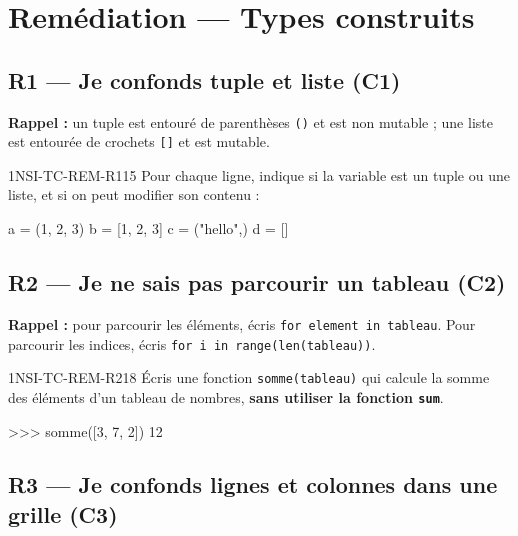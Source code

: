 \section*{Remédiation --- Types construits}

\subsection*{R1 --- Je confonds tuple et liste (C1)}

\textbf{Rappel :} un tuple est entouré de parenthèses \lstinline{()} et est non mutable ;
une liste est entourée de crochets \lstinline{[]} et est mutable.

\begin{exercice}{1NSI-TC-REM-R1}{1}{5}
Pour chaque ligne, indique si la variable est un tuple ou une liste, et si on peut modifier
son contenu :
\begin{python}
a = (1, 2, 3)
b = [1, 2, 3]
c = ("hello",)
d = []
\end{python}
\end{exercice}

\subsection*{R2 --- Je ne sais pas parcourir un tableau (C2)}

\textbf{Rappel :} pour parcourir les éléments, écris \lstinline{for element in tableau}.
Pour parcourir les indices, écris \lstinline{for i in range(len(tableau))}.

\begin{exercice}{1NSI-TC-REM-R2}{1}{8}
Écris une fonction \lstinline{somme(tableau)} qui calcule la somme des éléments d'un
tableau de nombres, \textbf{sans utiliser la fonction \lstinline{sum}}.
\begin{console}
>>> somme([3, 7, 2])
12
\end{console}
\end{exercice}

\subsection*{R3 --- Je confonds lignes et colonnes dans une grille (C3)}

